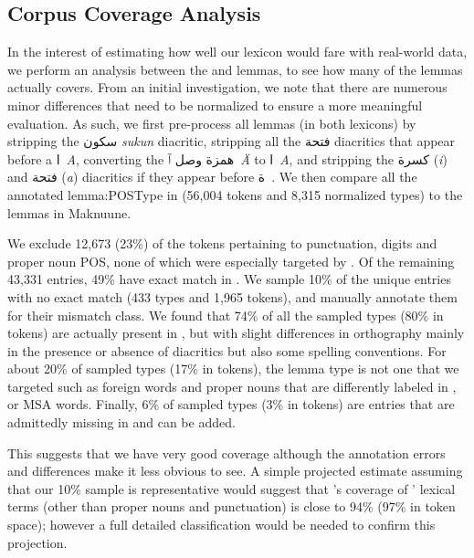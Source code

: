 \subsection*{Corpus Coverage Analysis}
\label{corpus-coverage-analysis}
In the interest of estimating how well our lexicon would fare with real-world data, we perform an analysis between the \curras and \maknuune lemmas, to see how many of the \curras lemmas \maknuune actually covers. From an initial investigation, we note that there are numerous minor differences that need to be normalized to ensure a more meaningful evaluation.
As such, we first pre-process all lemmas (in both lexicons) by stripping the \foreignlanguage{arabic}{سكون} {\it sukun} diacritic, stripping all the \foreignlanguage{arabic}{فتحة} diacritics that appear before a \foreignlanguage{arabic}{ا}~\textit{A},
converting the \foreignlanguage{arabic}{همزة وصل} \foreignlanguage{arabic}{ٱ}~\textit{Ä} to \foreignlanguage{arabic}{ا}~\textit{A}, and stripping the \foreignlanguage{arabic}{كسرة} (\textit{i}) and \foreignlanguage{arabic}{فتحة} (\textit{a}) diacritics if they appear before \foreignlanguage{arabic}{ة}~\textit{\TAMARBUTA}. We then compare all the annotated lemma:POSType
in \curras (56,004 tokens and 8,315 normalized types) to the lemmas in Maknuune.

We exclude 12,673 (23\%) of the tokens pertaining to punctuation, digits and proper noun POS, none of which were especially targeted by \maknuune. Of the remaining 43,331 entries, 49\% have exact match in \maknuune. We sample 10\% of the unique entries with no exact match (433 types and 1,965 tokens), and manually annotate them for their mismatch class.  We found that 74\% of all the sampled types (80\% in tokens) are actually present in \maknuune, but with slight differences in orthography mainly in the presence or absence of diacritics but also some spelling conventions. For about 20\% of sampled types (17\% in tokens), the lemma type is not one that we targeted such as foreign words and proper nouns that are differently labeled in \curras, or MSA words. Finally, 6\% of sampled types (3\% in tokens) are entries that are admittedly missing in \maknuune and can be added.

This suggests that we have very good coverage although the annotation errors and differences make it less obvious to see. A simple projected estimate assuming that our 10\% sample is representative would suggest that \maknuune's coverage of \curras' lexical terms (other than proper nouns and punctuation) is close to 94\% (97\% in token space); however a full detailed classification would be needed to confirm this projection. 

